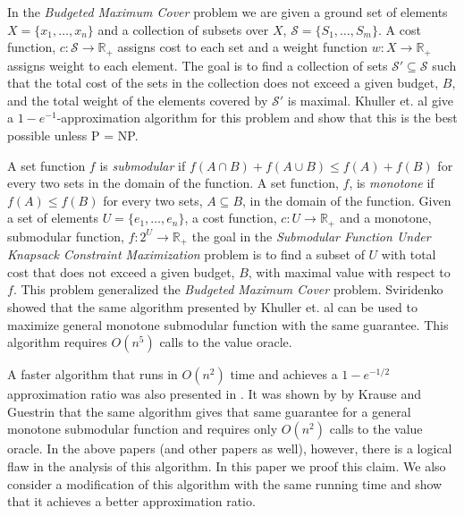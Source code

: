 In the \emph{Budgeted Maximum Cover} problem we are given a ground set of elements 
$X = \{x_1, \dots, x_n\}$ and a collection of subsets over $X$, 
$\mathcal{S} = \{S_1, \dots, S_m\}$.
A cost function, $c:\mathcal{S} \to \mathbb{R}_+$ assigns cost to each set 
and a weight function $w:X \to \mathbb{R}_+$ assigns weight to each element. 
The goal is to find a collection of sets $\mathcal{S'} \subseteq \mathcal{S}$ such that the 
total cost of the sets in the collection does not exceed a given budget, $B$, and the 
total weight of the elements covered by $\mathcal{S'}$ is maximal.
Khuller et. al \cite{khuller1999budgeted} 
give a $1-e^{-1}$-approximation algorithm for this problem and show that this is
the best possible unless P = NP.   

A set function $f$ is \emph{submodular} if $f(A \cap B) + f(A \cup B) \leq f(A) + f(B)$ 
for every two sets in the domain of the function. A set function, $f$, is \emph{monotone} if 
$f(A) \leq f(B)$ for every two sets, $A \subseteq B$, in the domain of the function.
Given a set of elements $U = \{e_1, \dots, e_n\}$, a cost function, 
$c:U \to \mathbb{R}_+$ and a monotone, submodular function, $f:2^U \to \mathbb{R}_+$ 
the goal in the \emph{Submodular Function Under
Knapsack Constraint Maximization} problem is to find a subset of $U$ with total cost that does not exceed
a given budget, $B$, with maximal value with respect to $f$.
This problem generalized the \emph{Budgeted Maximum Cover} problem. 
Sviridenko \cite{sviridenko2004note} showed that the same algorithm presented by 
Khuller et. al can be used to maximize general monotone submodular function 
with the same guarantee.
This algorithm requires $O(n^5)$ calls to the value oracle. 

A faster algorithm that runs in $O(n^2)$ time and achieves a $1 - e^{-1/2}$ approximation ratio
was also presented in \cite{khuller1999budgeted}. 
It was shown by by Krause and Guestrin \cite{krause2005note} that the same algorithm 
gives that same guarantee for a general monotone submodular function and requires only 
$O(n^2)$ calls to the value oracle.
In the above papers (and other papers as well), however, 
there is a logical flaw in the analysis of this algorithm. 
In this paper we proof this claim. 
We also consider a modification of this algorithm with the same running time and show that it
achieves a better approximation ratio.   